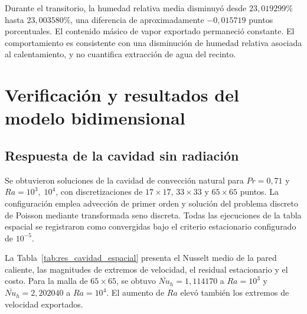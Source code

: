 Durante el transitorio, la humedad relativa media disminuyó desde $23{,}019299\%$ hasta $23{,}003580\%$, una diferencia de aproximadamente $-0{,}015719$ puntos porcentuales. El contenido másico de vapor exportado permaneció constante. El comportamiento es consistente con una disminución de humedad relativa asociada al calentamiento, y no cuantifica extracción de agua del recinto.




\FloatBarrier

\section{Verificación y resultados del modelo bidimensional}
\label{res:cavidad}

\subsection{Respuesta de la cavidad sin radiación}

Se obtuvieron soluciones de la cavidad de convección natural para $Pr=0{,}71$ y $Ra=10^3,\;10^4$, con discretizaciones de $17\times17$, $33\times33$ y $65\times65$ puntos. La configuración emplea advección de primer orden y solución del problema discreto de Poisson mediante transformada seno discreta. Todas las ejecuciones de la tabla espacial se registraron como convergidas bajo el criterio estacionario configurado de $10^{-5}$.

La Tabla~\ref{tab:res_cavidad_espacial} presenta el Nusselt medio de la pared caliente, las magnitudes de extremos de velocidad, el residual estacionario y el costo. Para la malla de $65\times65$, se obtuvo $\overline{Nu}_h=1{,}114170$ a $Ra=10^3$ y $\overline{Nu}_h=2{,}202040$ a $Ra=10^4$. El aumento de $Ra$ elevó también los extremos de velocidad exportados.


